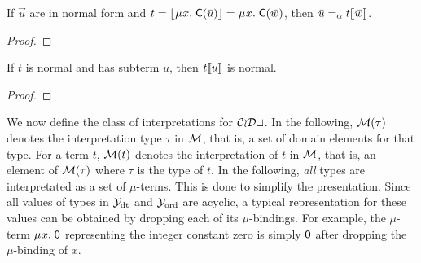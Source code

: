 \begin{report}
\begin{lemma}
\label{lem:mu-norm-arg}
If $\vec u$ are in normal form and $t = \nf{\MU x.\; \const{C}( \vec u )} = \MU x.\; \const{C}( \vec w )$,
then $\bar u \mathrel{=_\alpha} t\llbracket \bar w \rrbracket$.
\end{lemma}
\begin{proof}
\end{proof}

\begin{lemma}
\label{lem:mu-norm-interp}
If $t$ is normal and has subterm $u$, then $t \llbracket u \rrbracket$ is normal.
\end{lemma}
\begin{proof}
\end{proof}

\end{report}

We now define the class of interpretations for $\mathcal{CoDt}$.
In the following, $\mathcal{M}( \tau )$ denotes the interpretation type $\tau$ in $\mathcal{M}$,
that is, a set of domain elements for that type.
For a term $t$, $\mathcal{M}( t )$ denotes the interpretation of $t$ in $\mathcal{M}$,
that is, an element of $\mathcal{M}( \tau )$ where $\tau$ is the type of $t$.
In the following,
\emph{all} types are interpretated as a set of $\mu$-terms.
This is done to simplify the presentation.
Since all values of types in $\mathcal{Y}_{\mathrm{dt}}$ and $\mathcal{Y}_{\mathrm{ord}}$ are acyclic,
a typical representation for these values can be obtained by
dropping each of its $\mu$-bindings. 
For example, the $\mu$-term $\MU x.\; \const{0}$ representing the integer constant zero
is simply $\textsf{0}$ after dropping the $\mu$-binding of $x$.


